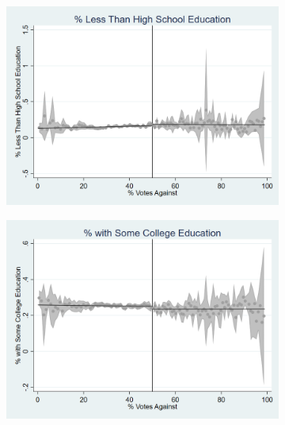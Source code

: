 \begin{figure}[ht]
    \vspace{1em}

    \begin{minipage}[b]{0.48\textwidth}
        \centering
        \begin{subfigure}[b]{\textwidth}
            \centering
            \includegraphics[width=\textwidth,keepaspectratio]{images/cov_smoothness_pctlesshs.png}
            \label{fig:pctlesshs_sm}
        \end{subfigure}
    \end{minipage}
    \hfill
    \begin{minipage}[b]{0.48\textwidth}
        \centering
        \begin{subfigure}[b]{\textwidth}
            \centering
            \includegraphics[width=\textwidth,keepaspectratio]{images/cov_smoothness_pctsomecoll.png}
            \label{fig:pctsomecoll_sm}
        \end{subfigure}
    \end{minipage}    


\end{figure}
